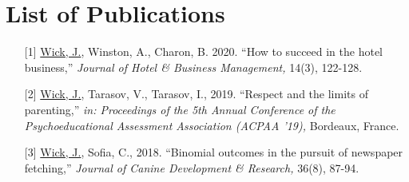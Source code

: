 \chapter*{List of Publications}

\begin{itemize}
\item[{[1]}]
\underline{Wick, J.}, Winston, A., Charon, B. 2020. 
``How to succeed in the hotel business,''
\emph{Journal of Hotel \& Business Management,} 14(3), 122-128.

\item[{[2]}]
\underline{Wick, J.}, Tarasov, V., Tarasov, I., 2019. 
``Respect and the limits of parenting,''
\emph{in: Proceedings of the 5th Annual Conference of the Psychoeducational Assessment Association (ACPAA '19),} Bordeaux, France.

\item[{[3]}]
\underline{Wick, J.}, Sofia, C., 2018. 
``Binomial outcomes in the pursuit of newspaper fetching,''
\emph{Journal of Canine Development \& Research,} 36(8), 87-94.

\end{itemize}
